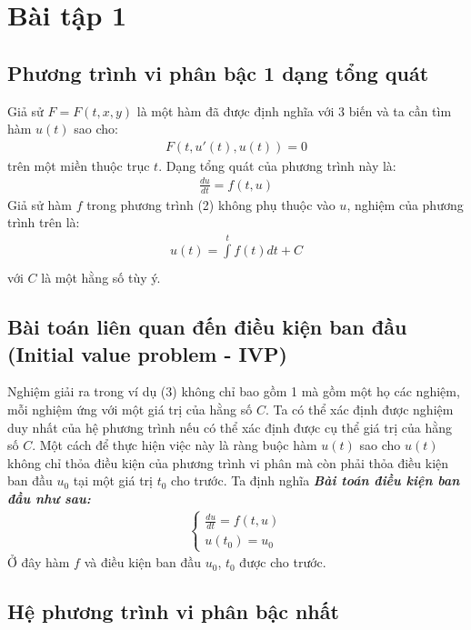 \section{Bài tập 1}
\subsection{Phương trình vi phân bậc 1 dạng tổng quát}
Giả sử $F = F(t,x,y)$ là một hàm đã được định nghĩa với 3 biến và ta cần tìm hàm $u(t)$ sao cho:
\begin{align}
     F(t,u'(t),u(t)) = 0
\end{align}
trên một miền thuộc trục $t$. Dạng tổng quát của phương trình này là:
\begin{align}
    \frac{du}{dt} = f(t, u)
\end{align}
Giả sử hàm $f$ trong phương trình (2) không phụ thuộc vào $u$, nghiệm của phương trình trên là:
\begin{align}
    u(t) = \int\limits_{}^{t}{f(t)dt} + C
\end{align}
với $C$ là một hằng số tùy ý.
\subsection{Bài toán liên quan đến điều kiện ban đầu (Initial value problem - IVP)}
Nghiệm giải ra trong ví dụ (3) không chỉ bao gồm 1 mà gồm một họ các nghiệm, mỗi nghiệm ứng với một giá trị của hằng số $C$. Ta có thể xác định được nghiệm duy nhất của hệ phương trình nếu có thể xác định được cụ thể giá trị của hằng số $C$. Một cách để thực hiện việc này là ràng buộc hàm $u(t)$ sao cho $u(t)$ không chỉ thỏa điều kiện của phương trình vi phân mà còn phải thỏa điều kiện ban đầu $u_0$ tại một giá trị $t_0$ cho trước. Ta định nghĩa \textbf{\textit{Bài toán điều kiện ban đầu như sau:}}
\begin{align}
    \begin{cases}
        \frac{du}{dt} = f(t, u)\\
        u(t_0) = u_0
    \end{cases}
\end{align}
Ở đây hàm $f$ và điều kiện ban đầu $u_0$, $t_0$ được cho trước.
\subsection{Hệ phương trình vi phân bậc nhất}
